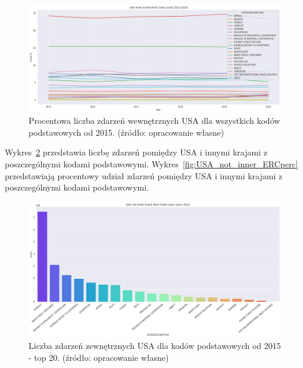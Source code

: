 \documentclass[11pt]{report}
\begin{document}
    \begin{figure}[!htp]
        \centering
        \includegraphics[width=\linewidth]{fig/USA inner/ERCperc.png}
        \caption{Procentowa liczba zdarzeń wewnętrznych USA dla wszystkich kodów podstawowych od 2015. (źródło: opracowanie własne)}
        \label{fig:USA_inner_ERCperc}
    \end{figure}

    Wykres~\ref{fig:USA_not_inner_ERC} przedstawia liczbę zdarzeń pomiędzy USA i innymi krajami z poszczególnymi kodami podstawowymi.
    Wykres~\ref{fig:USA_not_inner_ERCperc} przedstawiają procentowy udział zdarzeń pomiędzy USA i innymi krajami z poszczególnymi kodami podstawowymi.

    \begin{figure}[!htp]
        \centering
        \includegraphics[width=\linewidth]{fig/USA not inner/ERC.png}
        \caption{Liczba zdarzeń zewnętrznych USA dla kodów podstawowych od 2015 - top 20. (źródło: opracowanie własne)}
        \label{fig:USA_not_inner_ERC}
    \end{figure}
\end{document}
